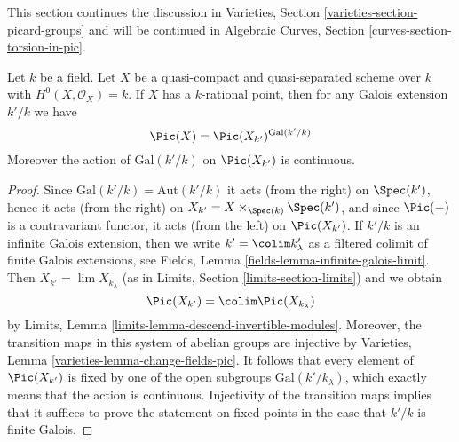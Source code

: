 \noindent
This section continues the discussion in
Varieties, Section \ref{varieties-section-picard-groups}
and will be continued in
Algebraic Curves, Section \ref{curves-section-torsion-in-pic}.

\begin{lemma}
\label{lemma-pic-descends}
Let $k$ be a field. Let $X$ be a quasi-compact and quasi-separated scheme
over $k$ with $H^0(X, \mathcal{O}_X) = k$. If $X$ has a $k$-rational point,
then for any Galois extension $k'/k$ we have
$$
\Pic(X) = \Pic(X_{k'})^{\text{Gal}(k'/k)}
$$
Moreover the action of $\text{Gal}(k'/k)$ on $\Pic(X_{k'})$
is continuous.
\end{lemma}

\begin{proof}
Since $\text{Gal}(k'/k) = \text{Aut}(k'/k)$ it acts (from the right)
on $\Spec(k')$, hence it acts (from the right) on
$X_{k'} = X \times_{\Spec(k)} \Spec(k')$, and since $\Pic(-)$
is a contravariant functor, it acts (from the left) on $\Pic(X_{k'})$.
If $k'/k$ is an infinite Galois extension, then we write
$k' = \colim k'_\lambda$ as a filtered colimit of finite Galois
extensions, see Fields, Lemma \ref{fields-lemma-infinite-galois-limit}.
Then $X_{k'} = \lim X_{k_\lambda}$
(as in Limits, Section \ref{limits-section-limits})
and we obtain
$$
\Pic(X_{k'}) = \colim \Pic(X_{k_\lambda})
$$
by Limits, Lemma \ref{limits-lemma-descend-invertible-modules}.
Moreover, the transition maps in this system of abelian groups
are injective by Varieties, Lemma \ref{varieties-lemma-change-fields-pic}.
It follows that every element of $\Pic(X_{k'})$ is fixed by
one of the open subgroups $\text{Gal}(k'/k_\lambda)$, which exactly
means that the action is continuous. Injectivity of the transition maps
implies that it suffices to prove the statement on fixed points in the
case that $k'/k$ is finite Galois.


\end{proof}
